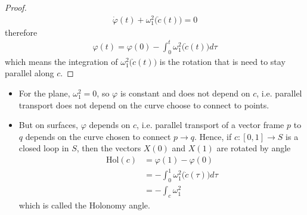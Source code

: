 \documentclass[10pt]{article}
\begin{document}
\begin{proof}
\begin{equation*}
\begin{aligned}
                        \dot{\varphi}(t) + \omega_1^2\big(\dot{c}(t)\big) = 0
                    \end{aligned}
                \end{equation*}
                therefore
                \begin{equation*}
                    \begin{aligned}
                        \varphi(t) = \varphi(0) - \int_0^t\omega_1^2\big(\dot{c}(t)\big)d\tau
                    \end{aligned}
                \end{equation*}
                which means the integration of $\omega_1^2\big(\dot{c}(t)\big)$ is the rotation that is need to stay parallel along $c$.
            \end{proof}
            \begin{remark}
                \begin{itemize}
                    \item For the plane, $\omega_1^2 = 0$, so $\varphi$ is constant and does not depend on $c$, i.e. parallel transport does not depend on the curve choose to connect to points.
                    \item But on surfaces, $\varphi$ depends on $c$, i.e. parallel transport of a vector frame $p$ to $q$ depends on the curve chosen to connect $p\to q$. Hence, if $c: [0,1]\to S$ is a closed loop in $S$, then the vectors $X(0)$ and $X(1)$ are rotated by angle
                    \begin{equation*}
                        \begin{aligned}
                            \text{Hol}(c) &= \varphi(1) - \varphi(0) \\
                            &= -\int_0^1\omega_1^2\big(\dot{c}(\tau)\big)d\tau \\
                            &= -\int_c\omega_1^2
                        \end{aligned}
                    \end{equation*}
                    which is called the Holonomy angle.
                \end{itemize}
            \end{remark}
            
            
            
            
            
                        
            
            
            
\end{document}
